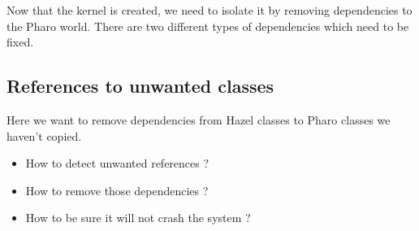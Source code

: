 %
%
%
%


Now that the kernel is created, we need to isolate it by removing dependencies 
to the \gls{Pharo} world. There are two different types of dependencies which need to be fixed.

\subsection{References to unwanted classes}

\goal Here we want to remove dependencies from Hazel classes to \gls{Pharo} classes we haven't copied.

\problems
\begin{itemize}
	\item How to detect unwanted references ?
	\item How to remove those dependencies ?
	\item How to be sure it will not crash the system ?
\end{itemize}

